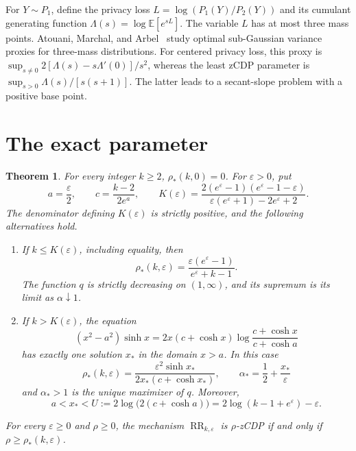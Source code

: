 \documentclass[11pt]{article}
\newtheorem{theorem}{Theorem}
\newcommand{\RR}{\operatorname{RR}}
\begin{document}
For $Y\sim P_1$, define the privacy loss
$L=\log(P_1(Y)/P_2(Y))$ and its cumulant generating function
$\Lambda(s)=\log\mathbb{E}[e^{sL}]$. The variable $L$ has at most three
mass points. Atouani, Marchal, and Arbel~\cite{AMA} study optimal
sub-Gaussian variance proxies for three-mass distributions. For centered
privacy loss, this proxy is
$\sup_{s\ne0}2[\Lambda(s)-s\Lambda'(0)]/s^2$, whereas the least zCDP
parameter is $\sup_{s>0}\Lambda(s)/[s(s+1)]$. The latter leads to a
secant-slope problem with a positive base point.

\section{The exact parameter}

\begin{theorem}\label{thm:main}
For every integer $k\geq2$, $\rho_*(k,0)=0$. For $\varepsilon>0$, put
\[
 a=\frac{\varepsilon}{2},\qquad
 c=\frac{k-2}{2e^a},\qquad
 K(\varepsilon)=
 \frac{2(e^\varepsilon-1)(e^\varepsilon-1-\varepsilon)}
 {\varepsilon(e^\varepsilon+1)-2e^\varepsilon+2}.
\]
The denominator defining $K(\varepsilon)$ is strictly positive, and the
following alternatives hold.
\begin{enumerate}
\item If $k\leq K(\varepsilon)$, including equality, then
\begin{equation}\label{eq:endpoint}
 \rho_*(k,\varepsilon)=
 \frac{\varepsilon(e^\varepsilon-1)}{e^\varepsilon+k-1}.
\end{equation}
The function $q$ is strictly decreasing on $(1,\infty)$, and its supremum
is its limit as $\alpha\downarrow1$.
\item If $k>K(\varepsilon)$, the equation
\begin{equation}\label{eq:root}
 (x^2-a^2)\sinh x
 =2x(c+\cosh x)
 \log\frac{c+\cosh x}{c+\cosh a}
\end{equation}
has exactly one solution $x_*$ in the domain $x>a$. In this case
\begin{equation}\label{eq:interior}
 \rho_*(k,\varepsilon)=
 \frac{\varepsilon^2\sinh x_*}{2x_*(c+\cosh x_*)},
 \qquad
 \alpha_*=\frac12+\frac{x_*}{\varepsilon}
\end{equation}
and $\alpha_*>1$ is the unique maximizer of $q$. Moreover,
\begin{equation}\label{eq:bracket}
 a<x_*<U:=2\log\bigl(2(c+\cosh a)\bigr)
       =2\log(k-1+e^\varepsilon)-\varepsilon.
\end{equation}
\end{enumerate}
For every $\varepsilon\geq0$ and $\rho\geq0$, the mechanism
$\RR_{k,\varepsilon}$ is $\rho$-zCDP if and only if
$\rho\geq\rho_*(k,\varepsilon)$.
\end{theorem}
\end{document}
